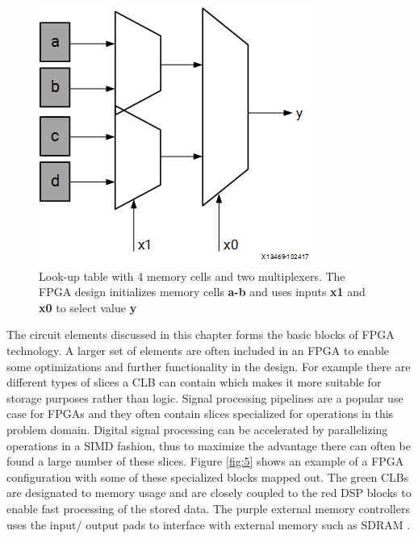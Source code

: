 \documentclass[12pt]{report}
\begin{document}
\begin{figure}[h]
    \centering
    \includegraphics[scale=0.5]{figures/lut.png}
    \caption{Look-up table with 4 memory cells and two multiplexers. The FPGA design initializes memory cells \textbf{a-b} and uses inputs \textbf{x1} and \textbf{x0} to select value \textbf{y} \citep{XilFPGAIntro}}
    \label{fig:4}
\end{figure}

The circuit elements discussed in this chapter forms the basic blocks of FPGA technology. A larger set of elements are often included in an FPGA to enable some optimizations and further functionality in the design. For example there are different types of slices a CLB can contain which makes it more suitable for storage purposes rather than logic. Signal processing pipelines are a popular use case for FPGAs and they often contain slices specialized for operations in this problem domain. Digital signal processing can be accelerated by parallelizing operations in a SIMD fashion, thus to maximize the advantage there can often be found a large number of these slices. Figure \ref{fig:5} shows an example of a FPGA configuration with some of these specialized blocks mapped out. The green CLBs are designated to memory usage and are closely coupled to the red DSP blocks to enable fast processing of the stored data. The purple external memory controllers uses the input/ output pads to interface with external memory such as SDRAM \citep{XilFPGAIntro} \citep{XilClbMan}.
\end{document}
